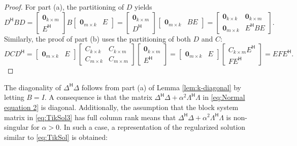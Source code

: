 \documentclass[12pt]{article}
\newcommand{\ctrans}[1]{{#1}^\mathsf{H}}	%
\newcommand{\regparam}{\alpha}
\newcommand{\zeroVec}{\bm{0}}	%
\begin{document}
\begin{proof}
For part (a), the partitioning of $D$ yields
\[\ctrans{D}BD = \begin{bmatrix}
\zeroVec_{k \times m} \\
\ctrans{E}
\end{bmatrix}B\begin{bmatrix}
\zeroVec_{m \times k} & E
\end{bmatrix} = \begin{bmatrix}
\zeroVec_{k \times m} \\
\ctrans{D}
\end{bmatrix}\begin{bmatrix}
\zeroVec_{m \times k} & BE
\end{bmatrix} = 
\begin{bmatrix}
\zeroVec_{k \times k} & \zeroVec_{k \times m} \\
\zeroVec_{m \times k} & \ctrans{E}BE
\end{bmatrix}.\]
Similarly, the proof of part (b) uses the partitioning of both $D$ and $C$:
\[DC\ctrans{D} = 
\begin{bmatrix}
\zeroVec_{m \times k} & E
\end{bmatrix}
\begin{bmatrix}
C_{k \times k} & C_{k \times m} \\
C_{m \times k} & C_{m \times m}
\end{bmatrix}
\begin{bmatrix}
\zeroVec_{k \times m} \\
\ctrans{E}
\end{bmatrix} = \begin{bmatrix}
\zeroVec_{m \times k} & E
\end{bmatrix}
\begin{bmatrix}
C_{k \times m}\ctrans{E} \\
F\ctrans{E}
\end{bmatrix} = EF\ctrans{E}.\]
\end{proof}
\noindent The diagonality of $\ctrans{\Delta}\Delta$ follows from part (a) of Lemma \ref{lem:k-diagonal} by letting $B = I$.  A consequence is that the matrix $\ctrans{\Delta}\Delta + \regparam^2 \ctrans{\Lambda}\Lambda$ in \eqref{eq:Normal equation 2} is diagonal. Additionally, the assumption that the block system matrix in \eqref{eq:TikSol3} has full column rank means that $\ctrans{\Delta}\Delta + \regparam^2 \ctrans{\Lambda}\Lambda$ is non-singular for $\regparam > 0$. In such a case, a representation of the regularized solution similar to \eqref{eq:TikSol} is obtained:
\end{document}
